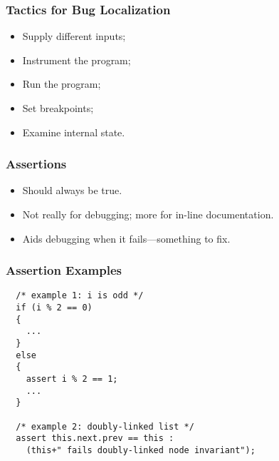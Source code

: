 \begin{frame}
\frametitle{Tactics for Bug Localization}

\begin{changemargin}{1cm}
\Large

\begin{itemize}\setlength{\itemsep}{1em}
\item Supply different inputs;
\item Instrument the program;
\item Run the program;
\item Set breakpoints;
\item Examine internal state.
\end{itemize}

\end{changemargin}

\end{frame}


\begin{frame}
\frametitle{Assertions}

\begin{changemargin}{1cm}
\Large


\normalsize
\begin{itemize}
\item Should always be true.

\item Not really for debugging; more for in-line documentation. 

\item Aids debugging when it fails---something to fix.
\end{itemize}

\end{changemargin}

\end{frame}

\begin{frame}[fragile]
\frametitle{Assertion Examples}

\begin{changemargin}{.5cm}

\begin{verbatim}
  /* example 1: i is odd */
  if (i % 2 == 0) 
  { 
    ... 
  } 
  else 
  { 
    assert i % 2 == 1; 
    ...
  }

  /* example 2: doubly-linked list */
  assert this.next.prev == this : 
    (this+" fails doubly-linked node invariant");
\end{verbatim}

\end{changemargin}

\end{frame}



